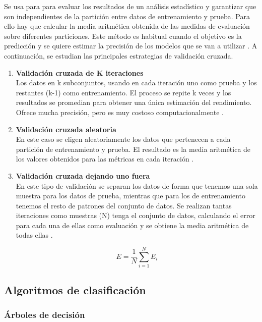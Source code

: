 \vspace{1em}

Se usa para para evaluar los resultados de un análisis estadístico y garantizar que son independientes de la partición entre datos de entrenamiento y prueba. Para ello hay que calcular la media aritmética obtenida de las medidas de evaluación sobre diferentes particiones. Este método es habitual cuando el objetivo es la predicción y se quiere estimar la precisión de los modelos que se van a utilizar \cite{crossval}. A continuación, se estudian las principales estrategias de validación cruzada.

\begin{enumerate}
	\item \textbf{Validación cruzada de K iteraciones} \\
		Los datos en k subconjuntos, usando en cada iteración uno como prueba y los restantes (k-1) como entrenamiento. El proceso se repite k veces y los resultados se promedian para obtener una única estimación del rendimiento. Ofrece mucha precisión, pero es muy costoso computacionalmente \cite{crossval1}.
	\item \textbf{Validación cruzada aleatoria} \\
		En este caso se eligen aleatoriamente los datos que pertenecen a cada partición de entrenamiento y prueba. El resultado es la media aritmética de los valores obtenidos para las métricas en cada iteración \cite{crossval2}.
	\item \textbf{Validación cruzada dejando uno fuera} \\
		En este tipo de validación se separan los datos de forma que tenemos una sola muestra para los datos de prueba, mientras que para los de entrenamiento tenemos el resto de patrones del conjunto de datos. Se realizan tantas iteraciones como muestras (N) tenga el conjunto de datos, calculando el error para cada una de ellas como evaluación y se obtiene la media aritmética de todas ellas \cite{crossval3}.

		\[
			E = \frac{1}{N} \sum_{i=1}^{N} E_{i}
		\]
\end{enumerate}

\subsection{Algoritmos de clasificación}
\label{subsec:clasificacion}

\subsubsection{Árboles de decisión}
\label{subsubsec:arboles}

